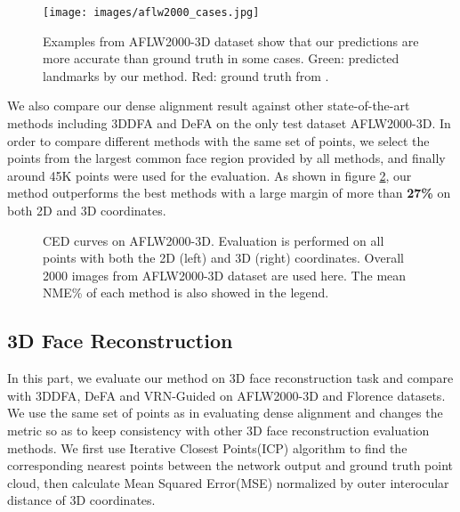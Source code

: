 \documentclass[runningheads]{llncs}
\begin{document}
\begin{figure} 
\vspace{-3mm}
\centering
\texttt{[image: images/aflw2000\_cases.jpg]} 
\caption{Examples from AFLW2000-3D dataset show that our predictions are more accurate than ground truth in some cases. Green: predicted landmarks by our method. Red: ground truth from \cite{zhu2016face}.}
\label{fig:aflw2000 cases} \vspace{-3mm}
\end{figure}

We also compare our dense alignment result against other state-of-the-art methods including 3DDFA\cite{zhu2016face} and DeFA\cite{liu2017dense} on the only test dataset AFLW2000-3D. 
In order to compare different methods with the same set of points, we select the points from the largest common face region provided by all methods, and finally around 45K points were used for the evaluation. 
As shown in figure \ref{fig:aflw2000 dense}, our method outperforms the best methods with a large margin of more than \textbf{27\%} on both 2D and 3D coordinates.
\begin{figure}
  \vspace{-3mm}
  \centering
  \caption{CED curves on AFLW2000-3D. Evaluation is performed on all points with both the 2D (left) and 3D (right) coordinates. Overall 2000 images from AFLW2000-3D dataset are used here. The mean NME\%  of each method is also showed in the legend.}
  \label{fig:aflw2000 dense} \vspace{-6mm}
\end{figure}




\subsection{3D Face Reconstruction} 
\label{sec: reconstruction}
In this part, we evaluate our method on 3D face reconstruction task and compare with 3DDFA\cite{zhu2016face}, DeFA\cite{liu2017dense} and VRN-Guided\cite{Jackson2017Large} on AFLW2000-3D and Florence datasets. 
We use the same set of points as in evaluating dense alignment and changes the metric so as to keep consistency with other 3D face reconstruction evaluation methods. 
We first use Iterative Closest Points(ICP) algorithm to find the corresponding nearest points between the network output and ground truth point cloud, then calculate Mean Squared Error(MSE) normalized by outer interocular distance of 3D coordinates. 
\end{document}
